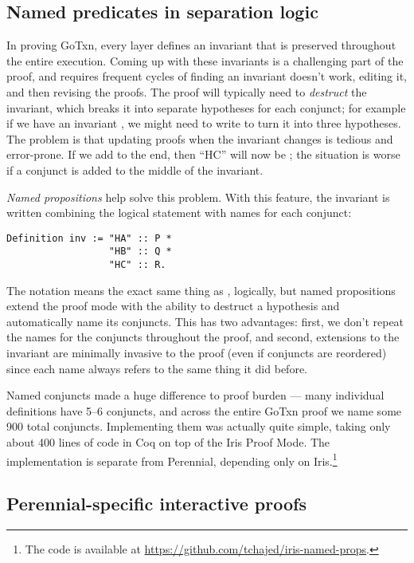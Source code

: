 \subsection{Named predicates in separation logic}

In proving GoTxn, every layer defines an invariant that is preserved throughout
the entire execution. Coming up with these invariants is a challenging part of
the proof, and requires frequent cycles of finding an invariant doesn't work,
editing it, and then revising the proofs. The proof will typically need to
\emph{destruct} the invariant, which breaks it into separate hypotheses for each
conjunct; for example if we have an invariant , we might
need to write  to turn it into three
hypotheses. The problem is that updating proofs when the invariant changes is
tedious and error-prone. If we add  to the end, then ``HC'' will now be
; the situation is worse if a conjunct is added to the middle of the
invariant.

\emph{Named propositions} help solve this problem. With this feature, the
invariant is written combining the logical statement with names for each conjunct:
\begin{verbatim}
Definition inv := "HA" :: P *
                  "HB" :: Q *
                  "HC" :: R.
\end{verbatim}
The notation  means the exact same thing as , logically, but
named propositions extend the proof mode with the ability to destruct a hypothesis and
automatically name its conjuncts. This has two advantages: first, we don't repeat
the names for the conjuncts throughout the proof, and second, extensions to the
invariant are minimally invasive to the proof (even if conjuncts are reordered)
since each name always refers to the same thing it did before.

Named conjuncts made a huge difference to proof burden --- many individual
definitions have 5--6 conjuncts, and across the entire GoTxn proof we name some
900 total conjuncts. Implementing them was actually quite simple, taking only
about 400 lines of code in Coq on top of the Iris Proof Mode. The implementation
is separate from Perennial, depending only on Iris.\footnote{The code is
available at \url{https://github.com/tchajed/iris-named-props}.}


\subsection{Perennial-specific interactive proofs}

